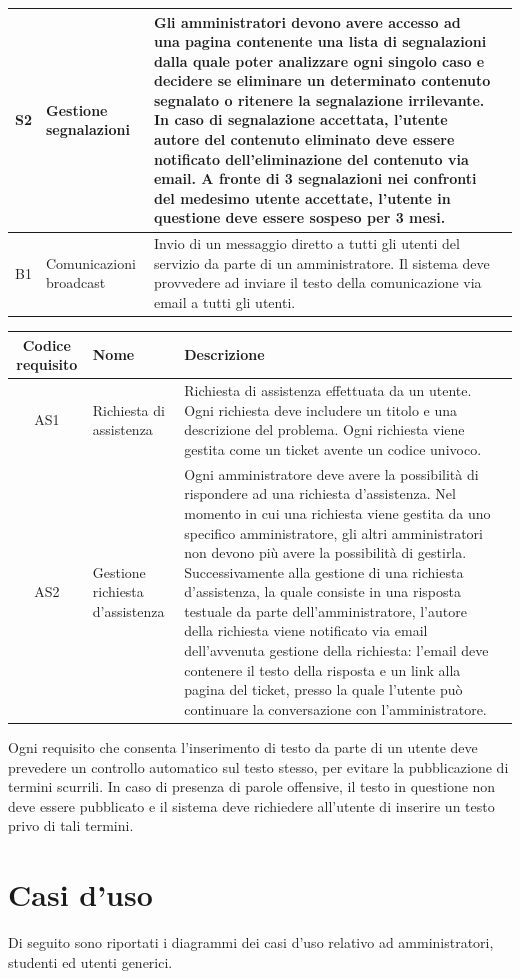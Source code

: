 \documentclass[10pt,a4paper]{report}
\begin{document}
\begin{tabular}{cp{3cm}p{9cm}p{1cm}}
		S2&Gestione segnalazioni&Gli amministratori devono avere accesso ad una pagina contenente una lista di segnalazioni dalla quale poter analizzare ogni singolo caso e decidere se eliminare un determinato contenuto segnalato o ritenere la segnalazione irrilevante. In caso di segnalazione accettata, l'utente autore del contenuto eliminato deve essere notificato dell'eliminazione del contenuto via email. A fronte di 3 segnalazioni nei confronti del medesimo utente accettate, l'utente in questione deve essere sospeso per 3 mesi.\\ \hline
		B1&Comunicazioni broadcast&Invio di un messaggio diretto a tutti gli utenti del servizio da parte di un amministratore. Il sistema deve provvedere ad inviare il testo della comunicazione via email a tutti gli utenti.\\ \hline
	\end{tabular}

	\begin{tabular}{cp{3cm}p{9cm}p{1cm}}
		Codice requisito&Nome&Descrizione\\ \hline
		AS1&Richiesta di assistenza&Richiesta di assistenza effettuata da un utente. Ogni richiesta deve includere un titolo e una descrizione del problema. Ogni richiesta viene gestita come un ticket avente un codice univoco.\\ \hline
		AS2&Gestione richiesta d'assistenza&Ogni amministratore deve avere la possibilità di rispondere ad una richiesta d'assistenza. Nel momento in cui una richiesta viene gestita da uno specifico amministratore, gli altri amministratori non devono più avere la possibilità di gestirla. Successivamente alla gestione di una richiesta d'assistenza, la quale consiste in una risposta testuale da parte dell'amministratore, l'autore della richiesta viene notificato via email dell'avvenuta gestione della richiesta: l'email deve contenere il testo della risposta e un link alla pagina del ticket, presso la quale l'utente può continuare la conversazione con l'amministratore.
	\end{tabular}
	\newline
	\newline
	Ogni requisito che consenta l'inserimento di testo da parte di un utente deve prevedere un controllo automatico sul testo stesso, per evitare la pubblicazione di termini scurrili. In caso di presenza di parole offensive, il testo in questione non deve essere pubblicato e il sistema deve richiedere all'utente di inserire un testo privo di tali termini.
	
	\section{Casi d'uso}
	Di seguito sono riportati i diagrammi dei casi d'uso relativo ad amministratori, studenti ed utenti generici.
	
\end{document}
